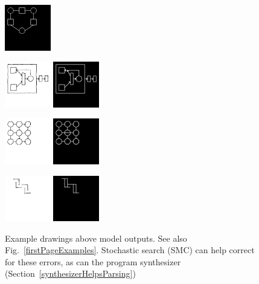 \documentclass{article}
\newcommand{\remark}[1]{\textcolor{red}{[#1]}}
\begin{document}
\begin{figure}[H]
\begin{minipage}[t]{2.25cm}
    \includegraphics[width = 2cm]{figures/77-parse.png}    
    \end{minipage}
  \begin{minipage}[t]{2.25cm}
    \includegraphics[width = 2cm]{figures/expert-1.png}
    \includegraphics[width = 2cm]{figures/expert-1-parse.png}    
  \end{minipage}
  \begin{minipage}[t]{2.25cm}
    \includegraphics[width = 2cm]{figures/expert-38.png}
    \includegraphics[width = 2cm]{figures/38-parse.png}     
  \end{minipage}
  \begin{minipage}[t]{2.25cm}
    \includegraphics[width = 2cm]{figures/expert-34.png}
    \includegraphics[width = 2cm]{figures/34-parse.png}     
    \end{minipage}
  \caption{Example drawings above model outputs. See also Fig.~\ref{firstPageExamples}. Stochastic search (SMC) can help correct for these errors, as can the program synthesizer (Section~\ref{synthesizerHelpsParsing})}\label{lotsOfHandDrawings}%
\end{figure}
\end{document}
